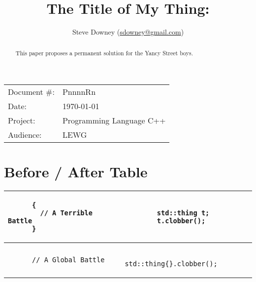 \documentclass[a4paper,10pt,oneside,openany,final,article]{memoir}
\begin{document}
\title{The Title of My Thing: }
\author{
  Steve Downey \small(\href{mailto:sdowney@gmail.com}{sdowney@gmail.com}) \\
}
\date{} %
\maketitle

\begin{flushright}
  \begin{tabular}{ll}
    Document \#: & PnnnnRn \\
    Date: & \today \\
    Project: & Programming Language C++ \\
    Audience: & LEWG
  \end{tabular}
\end{flushright}

\begin{abstract}
  This paper proposes  a permanent solution for the Yancy Street boys.
\end{abstract}

\tableofcontents*

\chapter{Before / After Table}
\begin{tabular}{ ll }
  \begin{minipage}[t]{0.45\columnwidth}
    \begin{verbatim}
      {
        // A Terrible Battle
      }

    \end{verbatim}
  \end{minipage}
  &
    \begin{minipage}[t]{0.45\columnwidth}
      \begin{verbatim}
        std::thing t;
        t.clobber();
      \end{verbatim}
    \end{minipage}
  \\ \midrule
  \begin{minipage}[t]{0.45\columnwidth}
    \begin{verbatim}
      // A Global Battle
    \end{verbatim}
  \end{minipage}
  &
    \begin{minipage}[t]{0.45\columnwidth}
      \begin{verbatim}
        std::thing{}.clobber();
      \end{verbatim}
    \end{minipage}
\end{tabular}
\end{document}

